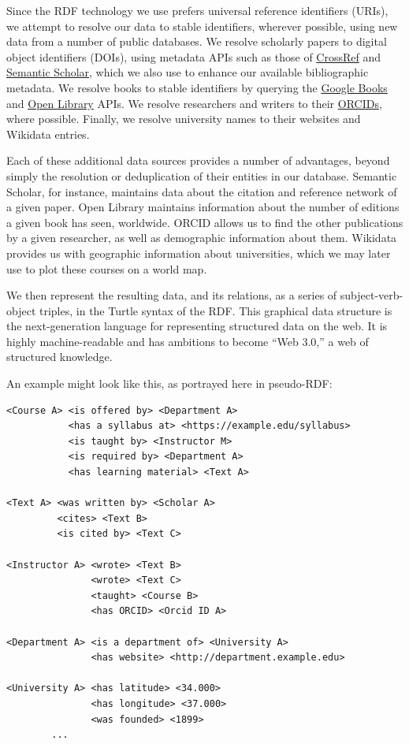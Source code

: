 \documentclass[
]{article}
\begin{document}
Since the RDF technology we use prefers universal reference identifiers
(URIs), we attempt to resolve our data to stable identifiers, wherever
possible, using new data from a number of public databases. We resolve
scholarly papers to digital object identifiers (DOIs), using metadata
APIs such as those of \href{https://www.crossref.org/}{CrossRef} and
\href{https://www.semanticscholar.org/}{Semantic Scholar}, which we also
use to enhance our available bibliographic metadata. We resolve books to
stable identifiers by querying the
\href{https://books.google.com/}{Google Books} and
\href{https://openlibrary.org/}{Open Library} APIs. We resolve
researchers and writers to their \href{https://orcid.org/}{ORCIDs},
where possible. Finally, we resolve university names to their websites
and Wikidata entries.

Each of these additional data sources provides a number of advantages,
beyond simply the resolution or deduplication of their entities in our
database. Semantic Scholar, for instance, maintains data about the
citation and reference network of a given paper. Open Library maintains
information about the number of editions a given book has seen,
worldwide. ORCID allows us to find the other publications by a given
researcher, as well as demographic information about them. Wikidata
provides us with geographic information about universities, which we may
later use to plot these courses on a world map.

We then represent the resulting data, and its relations, as a series of
subject-verb-object triples, in the Turtle syntax of the RDF. This
graphical data structure is the next-generation language for
representing structured data on the web. It is highly machine-readable
and has ambitions to become ``Web 3.0,'' a web of structured knowledge.

An example might look like this, as portrayed here in pseudo-RDF:

\begin{verbatim}
<Course A> <is offered by> <Department A>
           <has a syllabus at> <https://example.edu/syllabus>
           <is taught by> <Instructor M>
           <is required by> <Department A>
           <has learning material> <Text A>

<Text A> <was written by> <Scholar A>
         <cites> <Text B> 
         <is cited by> <Text C> 

<Instructor A> <wrote> <Text B>
               <wrote> <Text C>
               <taught> <Course B>
               <has ORCID> <Orcid ID A>

<Department A> <is a department of> <University A>
               <has website> <http://department.example.edu>

<University A> <has latitude> <34.000>
               <has longitude> <37.000>
               <was founded> <1899>
        ...
\end{verbatim}
\end{document}
